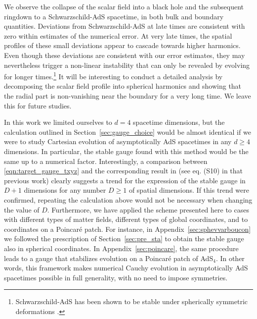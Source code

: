 \documentclass[a4paper,11pt]{article}
\numberwithin{equation}{section}
\begin{document}
We observe the collapse of the scalar field into a black hole and the subsequent ringdown to a Schwarzschild-AdS spacetime, in both bulk and boundary quantities.
Deviations from Schwarzschild-AdS at late times are consistent with zero within estimates of the numerical error. 
At very late times, the spatial profiles of these small deviations appear to cascade towards higher harmonics.
Even though these deviations are consistent with our error estimates, they may nevertheless trigger a non-linear instability that can only be revealed by evolving for longer times.\footnote{Schwarzschild-AdS has been shown to be stable under spherically symmetric deformations \cite{Holzegel:2011uu}.} 
It will be interesting to conduct a detailed analysis by decomposing the scalar field profile into spherical harmonics and showing that the radial part is non-vanishing near the boundary for a very long time. 
We leave this for future studies.

In this work we limited ourselves to $d=4$ spacetime dimensions, but the calculation outlined in Section~\ref{sec:gauge_choice} would be almost identical if we were to study Cartesian evolution of asymptotically AdS spacetimes in any $d\geq4$ dimensions. In particular, the stable gauge found with this method would be the same up to a numerical factor. 
Interestingly, a comparison between \eqref{eqn:target_gauge_txyz} and the corresponding result in \cite{Bantilan:2017kok} (see eq. (S10) in that previous work) clearly suggests a trend for the expression of the stable gauge in $D+1$ dimensions for any number $D\geq1$ of spatial dimensions. If this trend were confirmed, repeating the calculation above would not be necessary when changing the value of $D$. 
Furthermore, we have applied the scheme presented here to cases with different types of matter fields, different types of global coordinates, and to coordinates on a Poincar\'{e} patch. 
For instance, in Appendix~\ref{sec:sphevvarboucon} we followed the prescription of Section~\ref{sec:pre_sta} to obtain the stable gauge also in spherical coordinates.
In Appendix~\ref{sec:poincare}, the same procedure leads to a gauge that stabilizes evolution on a Poincar\'e patch of AdS$_4$.
In other words, this framework makes numerical Cauchy evolution in asymptotically AdS spacetimes possible in full generality, with no need to impose symmetries.
\end{document}

